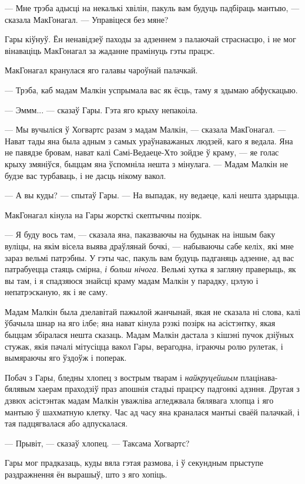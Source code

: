 --- Мне трэба адысці на некалькі хвілін, пакуль вам будуць падбіраць мантыю, --- сказала 
МакГонагал. --- Управіцеся без мяне?

Гары кіўнуў. Ён ненавідзеў паходы за адзеннем з палаючай страснасцю, і не мог вінаваціць
МакГонагал за жаданне прамінуць гэты працэс.

МакГонагал кранулася яго галавы чароўнай палачкай.

--- Трэба, каб мадам Малкін успрымала вас як ёсць, таму я здымаю абфускацыю.

--- Эммм... --- сказаў Гары. Гэта яго крыху непакоіла.

--- Мы вучыліся ў Хогвартс разам з мадам Малкін, --- сказала МакГонагал. --- Нават тады 
яна была адным з самых ураўнаважаных людзей, каго я ведала. Яна не павядзе бровам, нават калі
Самі-Ведаеце-Хто зойдзе ў краму, --- яе голас крыху змяніўся, быццам яна ўспомніла нешта
з мінулага. --- Мадам Малкін не будзе вас турбаваць, і не дасць нікому вакол.

--- А вы куды? --- спытаў Гары. --- На выпадак, ну ведаеце, калі нешта здарыцца.

МакГонагал кінула на Гары жорсткі скептычны позірк. 

--- Я буду вось там, --- сказала яна, паказваючы на будынак на іншым баку вуліцы, на якім вісела выява
драўлянай бочкі, --- набываючы сабе келіх, які мне зараз вельмі патрэбны. У гэты час, пакуль вам
будуць падганяць адзенне, ад вас патрабуецца стаяць смірна, \emph{і больш нічога}.
Вельмі хутка я загляну праверыць, як вы там, і я спадзяюся знайсці краму мадам Малкін у парадку,
цэлую і непатрэсканую, як і яе саму.

Мадам Малкін была дзелавітай пажылой жанчынай, якая не сказала ні слова, калі ўбачыла
шнар на яго ілбе; яна нават кінула рэзкі позірк на асістэнтку, якая быццам збіралася 
нешта сказаць. Мадам Малкін дастала з кішэні пучок дзіўных стужак, якія пачалі мітусіцца вакол
Гары, верагодна, іграючы ролю рулетак, і вымяраючы яго ўздоўж і поперак.

Побач з Гары, бледны хлопец з вострым тварам і \emph{найкруцейшым} плацінава-бялявым хаерам 
праходзіў праз апошнія стадыі працэсу падгонкі адзння. Другая з дзвюх асістэнтак мадам
Малкін уважліва агледжвала бялявага хлопца і яго мантыю ў шахматную клетку. Час ад часу яна 
краналася мантыі сваёй палачкай, і тая падцягвалася або адпускалася.

--- Прывіт, --- сказаў хлопец. --- Таксама Хогвартс?

Гары мог прадказаць, куды вяла гэтая размова, і ў секундным прыступе раздражнення ён вырашыў,
што з яго хопіць.


